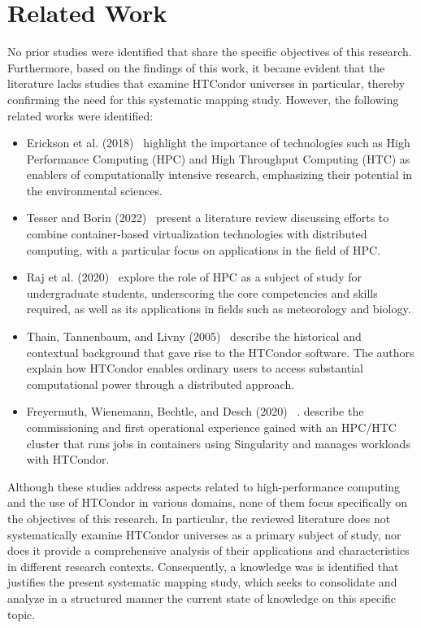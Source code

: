 \section{Related Work}\label{sec:trabajos-relacionados}
No prior studies were identified that share the specific objectives of this research. Furthermore, based on the findings of this work, it became evident that the literature lacks studies that examine HTCondor universes in particular, thereby confirming the need for this systematic mapping study.
However, the following related works were identified:
\begin{itemize}[label=\textbf{--}]
	\item Erickson et al. (2018)~\cite{EricksonA-01} highlight the importance of technologies such as High Performance Computing (HPC) and High Throughput Computing (HTC) as enablers of computationally intensive research, emphasizing their potential in the environmental sciences.
	\item Tesser and Borin (2022)~\cite{KellerTesser2023} present a literature review discussing efforts to combine container-based virtualization technologies with distributed computing, with a particular focus on applications in the field of HPC.
	\item Raj et al. (2020)~\cite{RajRomanowski2020} explore the role of HPC as a subject of study for undergraduate students, underscoring the core competencies and skills required, as well as its applications in fields such as meteorology and biology.
	\item Thain, Tannenbaum, and Livny (2005)~\cite{Livny-Tannenbaum2005} describe the historical and contextual background that gave rise to the HTCondor software. The authors explain how HTCondor enables ordinary users to access substantial computational power through a distributed approach.
	\item Freyermuth, Wienemann, Bechtle, and Desch (2020) ~\cite{Freyermuth2021a}. describe the commissioning and first operational experience gained with an HPC/HTC cluster that runs jobs in containers using Singularity and manages workloads with HTCondor.
\end{itemize}

Although these studies address aspects related to high-performance computing and the use of HTCondor in various domains, none of them focus specifically on the objectives of this research. In particular, the reviewed literature does not systematically examine HTCondor universes as a primary subject of study, nor does it provide a comprehensive analysis of their applications and characteristics in different research contexts. Consequently, a knowledge was is identified that justifies the present systematic mapping study, which seeks to consolidate and analyze in a structured manner the current state of knowledge on this specific topic.

